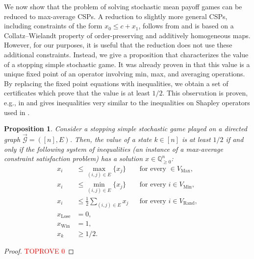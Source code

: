 \documentclass[11pt]{article}
\newtheorem{proposition}[theorem]{Proposition}
\theoremstyle{definition}
\theoremstyle{remark}
\newcommand{\Q}{\mathbb{Q}}
\newcommand{\dgraph}{\vec{\mathcal{G}}}
\newcommand{\vertices}{V}
\newcommand{\edges}{E}
\newcommand{\Max}{\mathrm{Max}}
\newcommand{\Min}{\mathrm{Min}}
\newcommand{\Rand}{\mathrm{Rand}}
\newcommand{\Maxvertices}{\vertices_{\Max}}
\newcommand{\Minvertices}{\vertices_{\Min}}
\newcommand{\Randvertices}{\vertices_{\Rand}}
\newcommand{\Win}{\mathrm{Win}}
\newcommand{\Lose}{\mathrm{Lose}}
\begin{document}
 We now show that the problem of solving stochastic mean payoff games can be reduced to max-average CSPs. 
 A reduction to slightly more general CSPs, including constraints of the form $x_0 \le c + x_1$, follows from \cite[Theorem~18]{issac2016jsc} and is based on a Collatz--Wielandt property of order-preserving and additively homogeneous maps. 
 However, for our purposes, it is useful that the reduction does not use these additional constraints.
 Instead, we give a proposition that characterizes the value of a stopping simple stochastic game. 
 It was already proven in \cite{condon} that this value is a unique fixed point of an operator involving min, max, and averaging operations. By replacing the fixed point equations with inequalities, we obtain a set of certificates which prove that the value is at least $1/2$. This observation is proven, e.g., in \cite{stochasticchapter} and gives inequalities very similar to the inequalities on Shapley operators used in \cite{issac2016jsc}.

 
\begin{proposition}\label{value_ineq}
Consider a stopping simple stochastic game played on a directed graph $\dgraph=([n],E)$. Then, the value of a state $k \in [n]$ is at least $1/2$ if and only if the following system of inequalities (an instance of a max-average constraint satisfaction problem) has a solution $x 
\in \Q_{\geq 0}^n$: 
\begin{equation}\label{eq:gameval}
\begin{aligned}
 x_i &\le \max_{(i,j) \in \edges}\{x_j\} && \text{for every } \in \Maxvertices, \\
 x_i &\le \min_{(i,j) \in \edges}\{x_j\} && \text{for every }  i \in \Minvertices,  \\
x_i &\le \frac{1}{2}\sum_{(i,j) \in \edges}x_{j}  && \text{for every } i \in \Randvertices,\\
x_{\Lose} &= 0,  \\
x_{\Win} &= 1,\\
x_k &\ge 1/2.
\end{aligned}
\end{equation}
\end{proposition}
\begin{proof}\textcolor{red}{TOPROVE 0}\end{proof}
\end{document}

